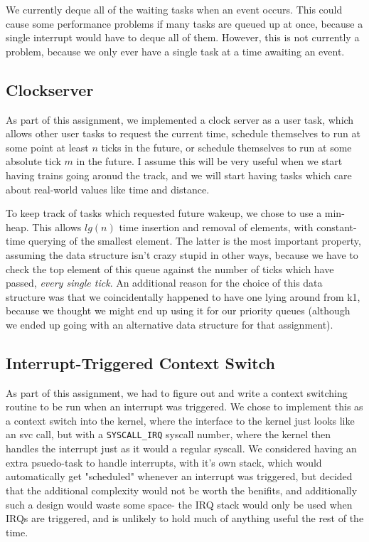 \documentclass[titlepage]{article}
\begin{document}
We currently deque all of the waiting tasks when an event occurs. This could
cause some performance problems if many tasks are queued up at once, because
a single interrupt would have to deque all of them. However, this is not
currently a problem, because we only ever have a single task at a time
awaiting an event.

\subsection{Clockserver}
As part of this assignment, we implemented a clock server as a user task, which
allows other user tasks to request the current time, schedule themselves to run
at some point at least $n$ ticks in the future, or schedule themselves to
run at some absolute tick $m$ in the future. I assume this will be very useful
when we start having trains going aronud the track, and we will start having
tasks which care about real-world values like time and distance.

To keep track of tasks which requested future wakeup, we chose to use a
min-heap. This allows $lg(n)$ time insertion and removal of elements, with
constant-time querying of the smallest element. The latter is the most
important property, assuming the data structure isn't crazy stupid in other
ways, because we have to check the top element of this queue against the
number of ticks which have passed, \emph{every single tick}. An additional
reason for the choice of this data structure was that we coincidentally
happened to have one lying around from k1, because we thought we might end up
using it for our priority queues (although we ended up going with an
alternative data structure for that assignment).

\subsection{Interrupt-Triggered Context Switch}
As part of this assignment, we had to figure out and write a context switching
routine to be run when an interrupt was triggered. We chose to implement this as
a context switch into the kernel, where the interface to the kernel just looks
like an svc call, but with a \texttt{SYSCALL\_IRQ} syscall number, where the kernel then
handles the interrupt just as it would a regular syscall. We considered having
an extra psuedo-task to handle interrupts, with it's own stack, which would
automatically get "scheduled" whenever an interrupt was triggered, but decided
that the additional complexity would not be worth the benifits, and additionally
such a design would waste some space- the IRQ stack would only be used when
IRQs are triggered, and is unlikely to hold much of anything useful the rest
of the time.
\end{document}
